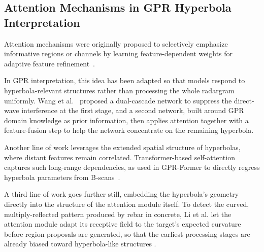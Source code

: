 \documentclass[lettersize,journal]{IEEEtran}
\begin{document}
\subsection{Attention Mechanisms in GPR Hyperbola Interpretation}

Attention mechanisms were originally proposed to selectively emphasize informative regions or channels by learning feature-dependent weights for adaptive feature refinement~\cite{hu2018senet,woo2018cbam}.

In GPR interpretation, this idea has been adapted so that models respond to hyperbola-relevant structures rather than processing the whole radargram uniformly. Wang et al.~\cite{Wang2025Underground} proposed a dual-cascade network to suppress the direct-wave interference at the first stage, and a second network, built around GPR domain knowledge as prior information, then applies attention together with a feature-fusion step to help the network concentrate on the remaining hyperbola.

Another line of work leverages the extended spatial structure of hyperbolas, where distant features remain correlated. Transformer-based self-attention captures such long-range dependencies, as used in GPR-Former to directly regress hyperbola parameters from B-scans~\cite{jin2024gprformer}.



A third line of work goes further still, embedding the hyperbola's geometry directly into the structure of the attention module itself. To detect the curved, multiply-reflected pattern produced by rebar in concrete, Li et al. let the attention module adapt its receptive field to the target's expected curvature before region proposals are generated, so that the earliest processing stages are already biased toward hyperbola-like structures \cite{li2025rebar}.
\end{document}
